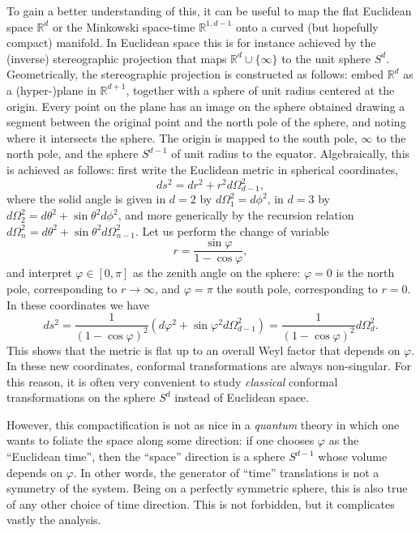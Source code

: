 \documentclass[a4paper,12pt]{article}
\numberwithin{equation}{section}
\begin{document}
To gain a better understanding of this, it can be useful to map the flat Euclidean space $\mathds{R}^d$ or the Minkowski space-time $\mathds{R}^{1,d-1}$ onto a curved (but hopefully compact) manifold.
In Euclidean space this is for instance achieved by the (inverse) stereographic projection that maps $\mathds{R}^d \cup \{ \infty \}$ to the unit sphere $S^d$.
Geometrically, the stereographic projection is constructed as follows: embed $\mathds{R}^d$ as a (hyper-)plane in $\mathds{R}^{d+1}$, together with a sphere of unit radius centered at the origin. Every point on the plane has an image on the sphere obtained drawing a segment between the original point and the north pole of the sphere, and noting where it intersects the sphere. The origin is mapped to the south pole, $\infty$ to the north pole, and the sphere $S^{d-1}$ of unit radius to the equator.
Algebraically, this is achieved as follows: first write the Euclidean metric in spherical coordinates,
\begin{equation}
	ds^2 = dr^2 + r^2 d\Omega_{d-1}^2,
\end{equation}
where the solid angle is given in $d = 2$ by $d\Omega_1^2 = d\phi^2$, in $d = 3$ by $d\Omega_2^2 = d\theta^2 + \sin\theta^2 d\phi^2$, and more generically by the recursion relation $d\Omega_n^2 = d\theta^2 + \sin\theta^2 d\Omega_{n-1}^2$.
Let us perform the change of variable
\begin{equation}
	r = \frac{\sin\varphi}{1 - \cos\varphi},
\end{equation}
and interpret $\varphi \in [0, \pi]$ as the zenith angle on the sphere:
$\varphi = 0$ is the north pole, corresponding to $r \to \infty$, and $\varphi = \pi$ the south pole, corresponding to $r = 0$. In these coordinates we have
\begin{equation}
	ds^2 = \frac{1}{(1 - \cos\varphi)^2}
	\left( d\varphi^2 + \sin\varphi^2 d\Omega_{d-1}^2 \right)
	= \frac{1}{(1 - \cos\varphi)^2} d\Omega_d^2.
\end{equation}
This shows that the metric is flat up to an overall Weyl factor that depends on $\varphi$.
In these new coordinates, conformal transformations are always non-singular. 
For this reason, it is often very convenient to study \emph{classical} conformal transformations on the sphere $S^d$ instead of Euclidean space.

However, this compactification is not as nice in a \emph{quantum} theory in which one wants to foliate the space along some direction: if one chooses $\varphi$ as the ``Euclidean time'', then the ``space'' direction is a sphere $S^{d-1}$ whose volume depends on $\varphi$. In other words, the generator of ``time'' translations is not a symmetry of the system. Being on a perfectly symmetric sphere, this is also true of any other choice of time direction.
This is not forbidden, but it complicates vastly the analysis.
\end{document}
